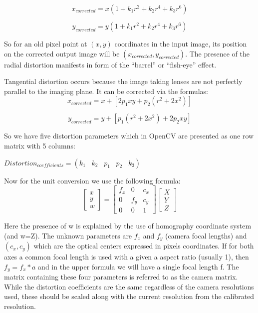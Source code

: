 \documentclass[11pt]{report}
\begin{document}
{{\begin{equation}
x_{corrected} = x(1+k_{1}r^{2}+k_{2}r^{4}+k_{3}r^{6})
\end{equation}


\begin{equation}
y_{corrected} = y(1+k_{1}r^{2}+k_{2}r^{4}+k_{3}r^{6})
\end{equation}

So for an old pixel point at ${(x,y)}$ coordinates in the input image, its position on the corrected output image will be ${(x_{corrected}, y_{corrected})}$. The presence of the radial distortion manifests in form of the “barrel” or “fish-eye” effect.

Tangential distortion occurs because the image taking lenses are not perfectly parallel to the imaging plane. It can be corrected via the formulas:
\begin{equation}
x_{corrected} = x + [2p_{1}xy + p_{2}(r^{2} + 2x^{2})] 
\end{equation}

\begin{equation}
y_{corrected} = y + [p_{1}(r^{2} + 2x^{2}) + 2p_{2}xy] 
\end{equation}

So we have five distortion parameters which in OpenCV are presented as one row matrix with 5 columns:

$Distortion_{coefficients}=(k_1 \hspace{10pt} k_2 \hspace{10pt} p_1 \hspace{10pt} p_2 \hspace{10pt} k_3)$

Now for the unit conversion we use the following formula:
\begin{equation}
\begin{bmatrix}
x \\ y \\w
\end{bmatrix}=
\begin{bmatrix}
f_x & 0 & c_x\\
0 & f_y & c_y\\
0 & 0 & 1
\end{bmatrix}
\begin{bmatrix}
X \\ Y \\ Z
\end{bmatrix}
\end{equation}


Here the presence of w is explained by the use of homography coordinate system (and w=Z). The unknown parameters are $f_x$ and $f_y$ (camera focal lengths) and $(c_x, c_y)$ which are the optical centers expressed in pixels coordinates. If for both axes a common focal length is used with a given a aspect ratio (usually 1), then $f_y=f_x*a$ and in the upper formula we will have a single focal length f. The matrix containing these four parameters is referred to as the camera matrix. While the distortion coefficients are the same regardless of the camera resolutions used, these should be scaled along with the current resolution from the calibrated resolution.

}}
\end{document}
